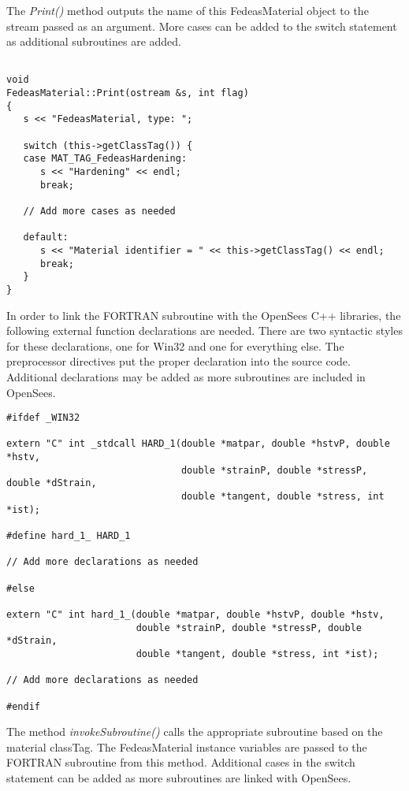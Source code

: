 \documentclass[12pt]{article}
\begin{document}
\noindent The {\em Print()} method outputs the name of this FedeasMaterial object to
the stream passed as an argument. More cases can be added to
the switch statement as additional subroutines are added.
    
{\sf\small
\begin{verbatim}

void
FedeasMaterial::Print(ostream &s, int flag)
{
   s << "FedeasMaterial, type: ";
           
   switch (this->getClassTag()) {
   case MAT_TAG_FedeasHardening:
      s << "Hardening" << endl;
      break;

   // Add more cases as needed
       
   default:
      s << "Material identifier = " << this->getClassTag() << endl;
      break;
   }
}
\end{verbatim}
}

\noindent In order to link the FORTRAN subroutine with the OpenSees C++ libraries, the
following external function declarations are needed. There are two syntactic styles for
these declarations, one for Win32 and one for everything else. The preprocessor directives
put the proper declaration into the source code. Additional declarations may be added
as more subroutines are included in OpenSees.

{\sf\small
\begin{verbatim}
#ifdef _WIN32

extern "C" int _stdcall HARD_1(double *matpar, double *hstvP, double *hstv,
                               double *strainP, double *stressP, double *dStrain,
                               double *tangent, double *stress, int *ist);

#define hard_1_ HARD_1

// Add more declarations as needed

#else

extern "C" int hard_1_(double *matpar, double *hstvP, double *hstv,
                       double *strainP, double *stressP, double *dStrain,
                       double *tangent, double *stress, int *ist);

// Add more declarations as needed

#endif
\end{verbatim}
}

\noindent The method {\em invokeSubroutine()} calls the appropriate subroutine based
on the material classTag. The FedeasMaterial instance variables are passed to the
FORTRAN subroutine from this method. Additional cases in the switch statement can
be added as more subroutines are linked with OpenSees.
\end{document}

